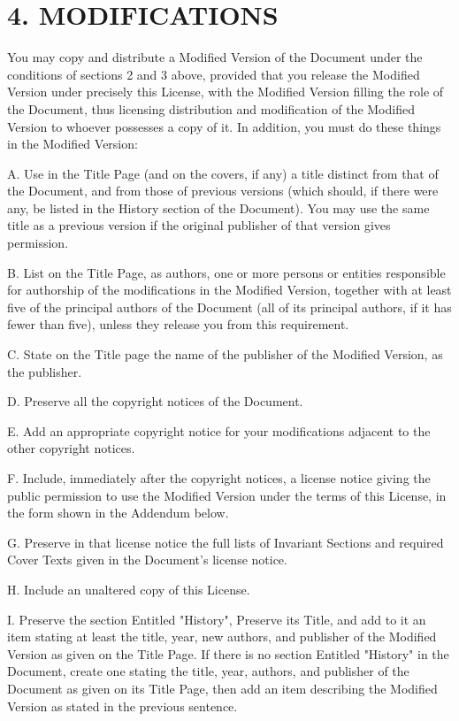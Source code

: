 \section{4. MODIFICATIONS}
You may copy and distribute a Modified Version of the Document under the conditions of sections 2 and 3 above, provided that you release the Modified Version under precisely this License, with the Modified Version filling the role of the Document, thus licensing distribution and modification of the Modified Version to whoever possesses a copy of it. In addition, you must do these things in the Modified Version:\par
A. Use in the Title Page (and on the covers, if any) a title distinct from that of the Document, and from those of previous versions (which should, if there were any, be listed in the History section of the Document). You may use the same title as a previous version if the original publisher of that version gives permission. \par
B. List on the Title Page, as authors, one or more persons or entities responsible for authorship of the modifications in the Modified Version, together with at least five of the principal authors of the Document (all of its principal authors, if it has fewer than five), unless they release you from this requirement. \par
C. State on the Title page the name of the publisher of the Modified Version, as the publisher. \par
D. Preserve all the copyright notices of the Document. \par
E. Add an appropriate copyright notice for your modifications adjacent to the other copyright notices. \par
F. Include, immediately after the copyright notices, a license notice giving the public permission to use the Modified Version under the terms of this License, in the form shown in the Addendum below. \par
G. Preserve in that license notice the full lists of Invariant Sections and required Cover Texts given in the Document's license notice. \par
H. Include an unaltered copy of this License. \par
I. Preserve the section Entitled "History", Preserve its Title, and add to it an item stating at least the title, year, new authors, and publisher of the Modified Version as given on the Title Page. If there is no section Entitled "History" in the Document, create one stating the title, year, authors, and publisher of the Document as given on its Title Page, then add an item describing the Modified Version as stated in the previous sentence. \par
